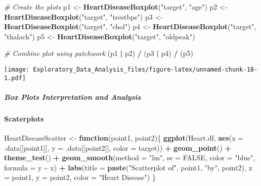 \documentclass[
]{article}
\newenvironment{Shaded}{\begin{snugshade}}{\end{snugshade}}
\newcommand{\AttributeTok}[1]{\textcolor[rgb]{0.13,0.29,0.53}{#1}}
\newcommand{\CommentTok}[1]{\textcolor[rgb]{0.56,0.35,0.01}{\textit{#1}}}
\newcommand{\ConstantTok}[1]{\textcolor[rgb]{0.56,0.35,0.01}{#1}}
\newcommand{\ControlFlowTok}[1]{\textcolor[rgb]{0.13,0.29,0.53}{\textbf{#1}}}
\newcommand{\FunctionTok}[1]{\textcolor[rgb]{0.13,0.29,0.53}{\textbf{#1}}}
\newcommand{\NormalTok}[1]{#1}
\newcommand{\OtherTok}[1]{\textcolor[rgb]{0.56,0.35,0.01}{#1}}
\newcommand{\SpecialCharTok}[1]{\textcolor[rgb]{0.81,0.36,0.00}{\textbf{#1}}}
\newcommand{\StringTok}[1]{\textcolor[rgb]{0.31,0.60,0.02}{#1}}
\begin{document}
\begin{Shaded}
\begin{Highlighting}[]
\CommentTok{\# Create the plots}
\NormalTok{p1 }\OtherTok{\textless{}{-}} \FunctionTok{HeartDiseaseBoxplot}\NormalTok{(}\StringTok{"target"}\NormalTok{, }\StringTok{"age"}\NormalTok{)}
\NormalTok{p2 }\OtherTok{\textless{}{-}} \FunctionTok{HeartDiseaseBoxplot}\NormalTok{(}\StringTok{"target"}\NormalTok{, }\StringTok{"trestbps"}\NormalTok{)}
\NormalTok{p3 }\OtherTok{\textless{}{-}} \FunctionTok{HeartDiseaseBoxplot}\NormalTok{(}\StringTok{"target"}\NormalTok{, }\StringTok{"chol"}\NormalTok{)}
\NormalTok{p4 }\OtherTok{\textless{}{-}} \FunctionTok{HeartDiseaseBoxplot}\NormalTok{(}\StringTok{"target"}\NormalTok{, }\StringTok{"thalach"}\NormalTok{)}
\NormalTok{p5 }\OtherTok{\textless{}{-}} \FunctionTok{HeartDiseaseBoxplot}\NormalTok{(}\StringTok{"target"}\NormalTok{, }\StringTok{"oldpeak"}\NormalTok{)}

\CommentTok{\# Combine plot using patchwork}
\NormalTok{(p1 }\SpecialCharTok{|}\NormalTok{ p2) }\SpecialCharTok{/}
\NormalTok{(p3 }\SpecialCharTok{|}\NormalTok{ p4) }\SpecialCharTok{/}
\NormalTok{(p5)}
\end{Highlighting}
\end{Shaded}

\texttt{[image: Exploratory\_Data\_Analysis\_files/figure-latex/unnamed-chunk-18-1.pdf]}

\subparagraph{\texorpdfstring{\textbf{Box Plots Interpretation and
Analysis}}{Box Plots Interpretation and Analysis}}\label{box-plots-interpretation-and-analysis}

\paragraph{\texorpdfstring{\textbf{Scaterplots}}{Scaterplots}}\label{scaterplots}

\begin{Shaded}
\begin{Highlighting}[]
\NormalTok{HeartDiseaseScatter }\OtherTok{\textless{}{-}} \ControlFlowTok{function}\NormalTok{(point1, point2)\{}
  \FunctionTok{ggplot}\NormalTok{(Heart.df, }\FunctionTok{aes}\NormalTok{(}\AttributeTok{x =}\NormalTok{ .data[[point1]],}
                       \AttributeTok{y =}\NormalTok{ .data[[point2]],}
                       \AttributeTok{color =}\NormalTok{ target)) }\SpecialCharTok{+}
    \FunctionTok{geom\_point}\NormalTok{() }\SpecialCharTok{+} \FunctionTok{theme\_test}\NormalTok{() }\SpecialCharTok{+}
    \FunctionTok{geom\_smooth}\NormalTok{(}\AttributeTok{method =} \StringTok{"lm"}\NormalTok{, }\AttributeTok{se =} \ConstantTok{FALSE}\NormalTok{, }\AttributeTok{color =} \StringTok{"blue"}\NormalTok{, }\AttributeTok{formula =}\NormalTok{ y }\SpecialCharTok{\textasciitilde{}}\NormalTok{ x) }\SpecialCharTok{+}
    \FunctionTok{labs}\NormalTok{(}\AttributeTok{title =} \FunctionTok{paste}\NormalTok{(}\StringTok{"Scatterplot of"}\NormalTok{, point1, }\StringTok{"by"}\NormalTok{, point2),}
       \AttributeTok{x =}\NormalTok{ point1, }\AttributeTok{y =}\NormalTok{ point2, }\AttributeTok{color =} \StringTok{"Heart Disease"}\NormalTok{)}
\NormalTok{\}}
\end{Highlighting}
\end{Shaded}
\end{document}
